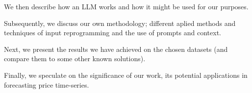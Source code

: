 We then describe how an LLM works and how it might be used for our purposes.

Subsequently, we discuss our own methodology; different aplied methods and techniques of input reprogramming and the use of prompts and context.

Next, we present the results we have achieved on the chosen datasets (and compare them to some other known solutions).

Finally, we speculate on the significance of our work, its potential applications in forecasting price time-series.
